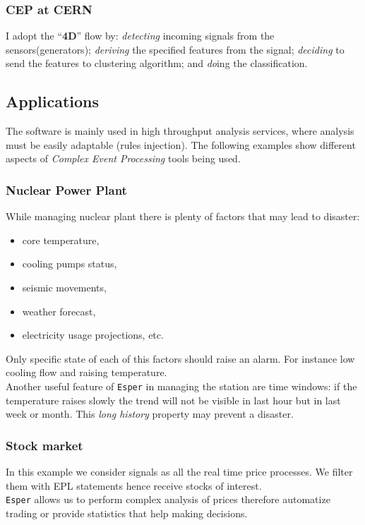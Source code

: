 \documentclass[11pt, letterpaper]{article}            %
\begin{document}
\subsubsection{CEP at CERN}
I adopt the ``\textbf{4D}'' flow by: \emph{detecting} incoming signals from the sensors(generators); \emph{deriving} the specified features from the signal; \emph{deciding} to send the features to clustering algorithm; and \emph{do}ing the classification.

\subsection{Applications}
The software is mainly used in high throughput analysis services, where analysis must be easily adaptable (rules injection). The following examples show different aspects of \emph{Complex Event Processing} tools being used.
\subsubsection{Nuclear Power Plant}
While managing nuclear plant there is plenty of factors that may lead to disaster:
\begin{itemize}
\item core temperature,
\item cooling pumps status,
\item seismic movements,
\item weather forecast,
\item electricity usage projections, etc.
\end{itemize}
Only specific state of each of this factors should raise an alarm. For instance low cooling flow and raising temperature.\\
Another useful feature of \texttt{Esper} in managing the station are time windows: if the temperature raises slowly the trend will not be visible in last hour but in last week or month. This \emph{long history} property may prevent a disaster.
\subsubsection{Stock market}
In this example we consider signals as all the real time price processes. We filter them with EPL statements hence receive stocks of interest.\\
\texttt{Esper} allows us to perform complex analysis of prices therefore automatize trading or provide statistics that help making decisions.
\end{document}

